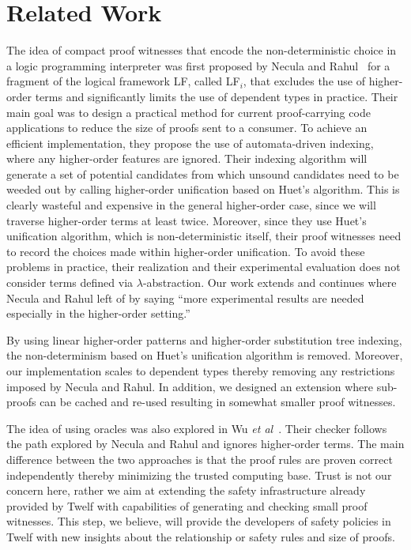 \documentclass{llncs}
\newcommand{\ednote}[1]{\footnote{\it #1}}
\begin{document}
\section{Related Work}
The idea of compact proof witnesses that encode the non-deterministic
choice in a logic programming interpreter was first proposed by Necula
and Rahul~\cite{Necula+01:oracle} for a fragment of the logical
framework LF, called LF$_i$, that excludes the use of higher-order
terms and significantly limits the use of dependent types in practice.
Their main goal was to design a practical method for current
proof-carrying code applications to reduce the size of proofs
sent to a consumer.
To achieve an efficient implementation, they propose the use of
automata-driven indexing, where any higher-order features are
ignored. Their indexing algorithm will generate a set of potential
candidates from which unsound candidates need to be weeded out by
calling higher-order unification based on Huet's algorithm. This
is clearly wasteful and expensive in the general higher-order case,
since we will traverse higher-order terms at least twice. Moreover,
since they use Huet's unification algorithm, which is
non-deterministic itself, their proof witnesses need to record the
choices made within higher-order unification. To avoid these problems
in practice, their realization and their experimental evaluation does
not consider terms defined via $\lambda$-abstraction.  
Our work extends and continues where Necula and Rahul left of by
saying ``more experimental results are needed especially in the
higher-order setting.'' 

By using linear higher-order patterns and higher-order substitution
tree indexing, the non-determinism based on Huet's unification
algorithm is removed. Moreover, our implementation scales to dependent
types thereby removing any restrictions imposed by Necula and
Rahul. In addition, we designed an extension where sub-proofs can be
cached and re-used resulting in somewhat smaller proof witnesses.

The idea of using oracles was also explored in Wu {\em et
al}~\cite{Appel:PPDP03}.  Their checker follows the path explored by
Necula and Rahul and ignores higher-order terms. The main difference
between the two approaches is that the proof rules are proven correct
independently thereby minimizing the trusted computing base. Trust is
not our concern here, rather we aim at extending the safety
infrastructure already provided by Twelf with capabilities of
generating and checking small proof witnesses. This step, we believe,
will provide the developers of safety policies in Twelf with new
insights about the relationship or safety rules and size of proofs.
\end{document}
